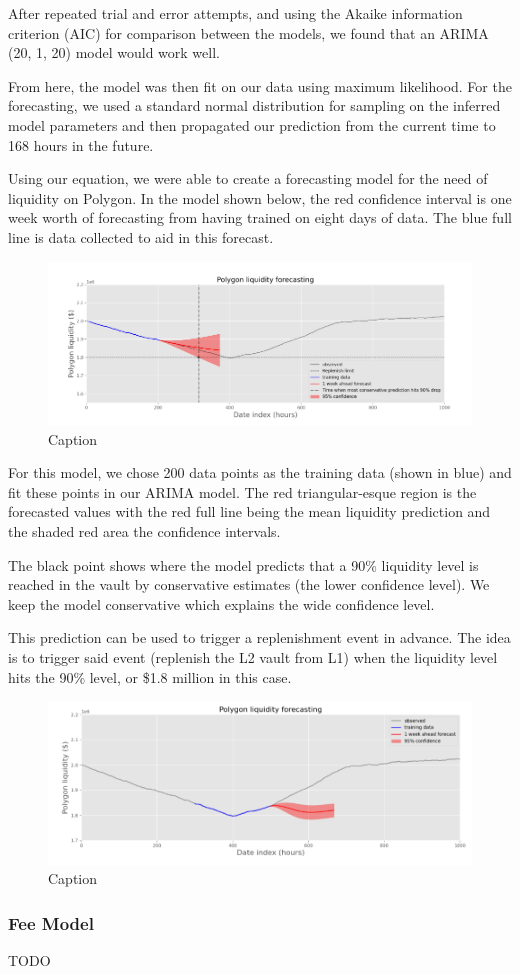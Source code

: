 After repeated trial and error attempts, and using the Akaike information criterion (AIC) for comparison between the models, we found that an ARIMA (20, 1, 20) model would work well.

From here, the model was then fit on our data using maximum likelihood. For the forecasting, we used a standard normal distribution for sampling on the inferred model parameters and then propagated our prediction from the current time to 168 hours in the future.

Using our equation, we were able to create a forecasting model for the need of liquidity on Polygon. In the model shown below, the red confidence interval is one week worth of forecasting from having trained on eight days of data. The blue full line is data collected to aid in this forecast.
%
\begin{figure}
    \centering
    \includegraphics[width=15cm]{images/mosaic/forecast2.png}
    \caption{Caption}
    \label{fig:forecast1}
\end{figure}
%
For this model, we chose 200 data points as the training data (shown in blue) and fit these points in our ARIMA model. The red triangular-esque region is the forecasted values with the red full line being the mean liquidity prediction and the shaded red area the confidence intervals.

The black point shows where the model predicts that a 90\% liquidity level is reached in the vault by conservative estimates (the lower confidence level). We keep the model conservative which explains the wide confidence level.

This prediction can be used to trigger a replenishment event in advance. The idea is to trigger said event (replenish the L2 vault from L1) when the liquidity level hits the 90\% level, or \$1.8 million in this case.
%
\begin{figure}
    \centering
    \includegraphics[width=15cm]{images/mosaic/forecast3.png}
    \caption{Caption}
    \label{fig:forecast1}
\end{figure}
%

\subsubsection{Fee Model}
TODO
